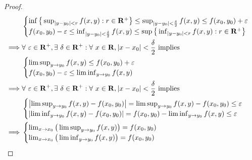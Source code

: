 \begin{proof}
\begin{align*}
                 & \begin{cases}
            \inf\big\{\sup_{\abs*{y - y_0} < r} f(x, y) : r \in \mathbf{R}^+\big\} \leq \sup_{\abs*{y - y_0} < \frac{\delta}{2}} f(x, y) \leq f(x_0, y_0) + \varepsilon \\
            f(x_0, y_0) - \varepsilon \leq \inf_{\abs*{y - y_0} < \frac{\delta}{2}} f(x, y) \leq \sup\big\{\inf_{\abs*{y - y_0} < r} f(x, y) : r \in \mathbf{R}^+\big\}
        \end{cases}                                                                                                                                           \\
        \implies & \forall\ \varepsilon \in \mathbf{R}^+, \exists\ \delta \in \mathbf{R}^+ : \forall\ x \in \mathbf{R}, \abs*{x - x_0} < \frac{\delta}{2} \text{ implies}               \\
                 & \begin{cases}
            \limsup_{y \to y_0} f(x, y) \leq f(x_0, y_0) + \varepsilon \\
            f(x_0, y_0) - \varepsilon \leq \liminf_{y \to y_0} f(x, y)
        \end{cases}                                                                                                                                           \\
        \implies & \forall\ \varepsilon \in \mathbf{R}^+, \exists\ \delta \in \mathbf{R}^+ : \forall\ x \in \mathbf{R}, \abs*{x - x_0} < \frac{\delta}{2} \text{ implies}               \\
                 & \begin{cases}
            \abs*{\limsup_{y \to y_0} f(x, y) - f(x_0, y_0)} = \limsup_{y \to y_0} f(x, y) - f(x_0, y_0) \leq \varepsilon \\
            \abs*{\liminf_{y \to y_0} f(x, y) - f(x_0, y_0)} = f(x_0, y_0) - \liminf_{y \to y_0} f(x, y) \leq \varepsilon
        \end{cases}                                                                                                                                           \\
        \implies & \begin{cases}
            \lim_{x \to x_0} \big(\limsup_{y \to y_0} f(x, y)\big) = f(x_0, y_0) \\
            \lim_{x \to x_0} \big(\liminf_{y \to y_0} f(x, y)\big) = f(x_0, y_0)
        \end{cases}
    \end{align*}

\end{proof}
